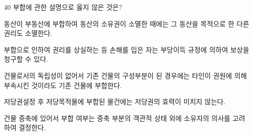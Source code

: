 \begin{question}{40}
부합에 관한 설명으로 옳지 않은 것은?
\begin{choices}
  \item 동산이 부동산에 부합하여 동산의 소유권이 소멸한 때에는 그 동산을 목적으로 한 다른 권리도 소멸한다.
  \item 부합으로 인하여 권리를 상실하는 등 손해를 입은 자는 부당이득 규정에 의하여 보상을 청구할 수 있다.
  \item 건물로서의 독립성이 없어서 기존 건물의 구성부분이 된 경우에는 타인이 권원에 의해 부속시킨 것이라도 기존 건물에 부합한다.
  \item 저당권설정 후 저당목적물에 부합된 물건에는 저당권의 효력이 미치지 않는다.
  \item 건물 증축에 있어서 부합 여부는 증축 부분의 객관적 상태 외에 소유자의 의사를 고려하여 결정한다.
\end{choices}
\end{question}
